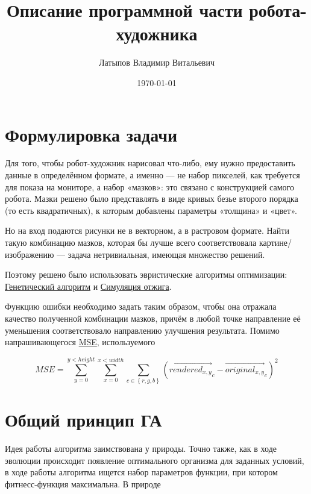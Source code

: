 \documentclass[11pt]{article}
\title{Описание программной части робота-художника}
\author{Латыпов Владимир Витальевич}
\date{\today}
\begin{document}
    \maketitle



    \section{Формулировка задачи}

    Для того, чтобы робот-художник нарисовал что-либо, ему нужно предоставить данные в определённом формате, а именно — не набор пикселей,
    как требуется для показа на мониторе, а набор «мазков»: это связано с конструкцией самого робота.
    Мазки решено было представлять в виде кривых безье второго порядка (то есть квадратичных), к которым добавлены параметры «толщина» и «цвет».

    Но на вход подаются рисунки не в векторном, а в растровом формате.
    Найти такую комбинацию мазков, которая бы лучше всего соответствовала картине/изображению — задача нетривиальная, имеющая множество решений.

    Поэтому решено было использовать эвристические алгоритмы оптимизации:
    \href{https://en.wikipedia.org/wiki/Simulated_annealing}{Генетический алгоритм} и \href{https://en.wikipedia.org/wiki/Simulated_annealing}{Симуляция отжига}.

    Функцию ошибки необходимо задать таким образом, чтобы она отражала качество полученной комбинации мазков,
    причём в любой точке направление её уменьшения соответствовало направлению улучшения результата.
    Помимо напрашивающегося \href{https://en.wikipedia.org/wiki/Mean_squared_error}{MSE}, используемого

    \begin{equation}\label{eq:equation}
        MSE = \sum_{y = 0}^{y < height} { \sum_{x = 0}^{x < width} { \sum_{c \in  \left\{ r, g, b \right\} } { \left( {\overrightarrow {rendered_{x, y}}}_c - {\overrightarrow{original_{x, y}}}_c\right)^2 }}}
    \end{equation}


    \section{Общий принцип ГА}
    Идея работы алгоритма заимствована у природы.
    Точно также, как в ходе эволюции происходит появление оптимального организма для заданных условий,
    в ходе работы алгоритма ищется набор параметров функции, при котором фитнесс-функция максимальна.
    В природе
\end{document}
